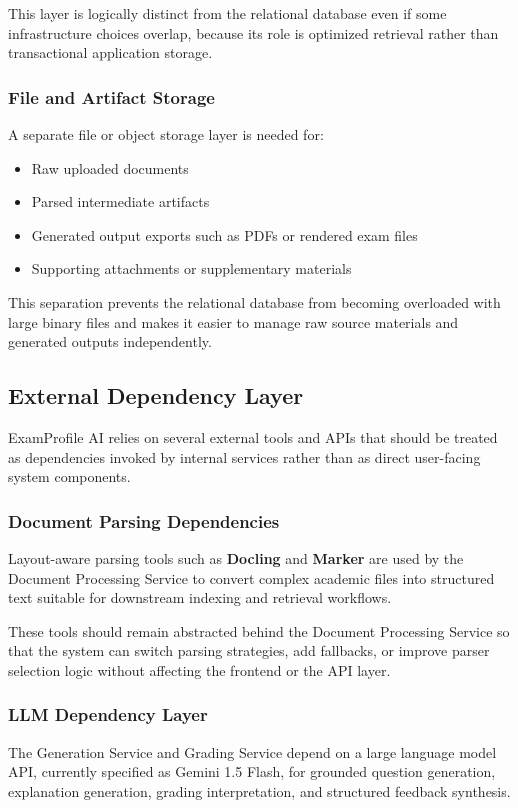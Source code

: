 \documentclass[11pt]{article}
\begin{document}
This layer is logically distinct from the relational database even if some infrastructure choices overlap, because its role is optimized retrieval rather than transactional application storage.

\subsubsection{File and Artifact Storage}
A separate file or object storage layer is needed for:
\begin{itemize}
\item Raw uploaded documents
\item Parsed intermediate artifacts
\item Generated output exports such as PDFs or rendered exam files
\item Supporting attachments or supplementary materials
\end{itemize}

This separation prevents the relational database from becoming overloaded with large binary files and makes it easier to manage raw source materials and generated outputs independently.

\subsection{External Dependency Layer}
ExamProfile AI relies on several external tools and APIs that should be treated as dependencies invoked by internal services rather than as direct user-facing system components.

\subsubsection{Document Parsing Dependencies}
Layout-aware parsing tools such as \textbf{Docling} and \textbf{Marker} are used by the Document Processing Service to convert complex academic files into structured text suitable for downstream indexing and retrieval workflows.

These tools should remain abstracted behind the Document Processing Service so that the system can switch parsing strategies, add fallbacks, or improve parser selection logic without affecting the frontend or the API layer.

\subsubsection{LLM Dependency Layer}
The Generation Service and Grading Service depend on a large language model API, currently specified as Gemini 1.5 Flash, for grounded question generation, explanation generation, grading interpretation, and structured feedback synthesis.
\end{document}

